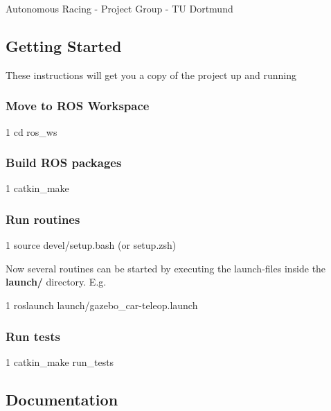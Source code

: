 Autonomous Racing -\/ Project Group -\/ TU Dortmund

\href{https://travis-ci.com/Autonomous-Racing-PG/ros.package}{\tt }

\subsection*{Getting Started}

These instructions will get you a copy of the project up and running

\subsubsection*{Move to R\+OS Workspace}


\begin{DoxyCode}
1 cd ros\_ws
\end{DoxyCode}


\subsubsection*{Build R\+OS packages}


\begin{DoxyCode}
1 catkin\_make
\end{DoxyCode}


\subsubsection*{Run routines}


\begin{DoxyCode}
1 source devel/setup.bash (or setup.zsh)
\end{DoxyCode}


Now several routines can be started by executing the launch-\/files inside the {\bfseries launch/} directory. E.\+g.


\begin{DoxyCode}
1 roslaunch launch/gazebo\_car-teleop.launch
\end{DoxyCode}


\subsubsection*{Run tests}


\begin{DoxyCode}
1 catkin\_make run\_tests
\end{DoxyCode}


\subsection*{Documentation}


